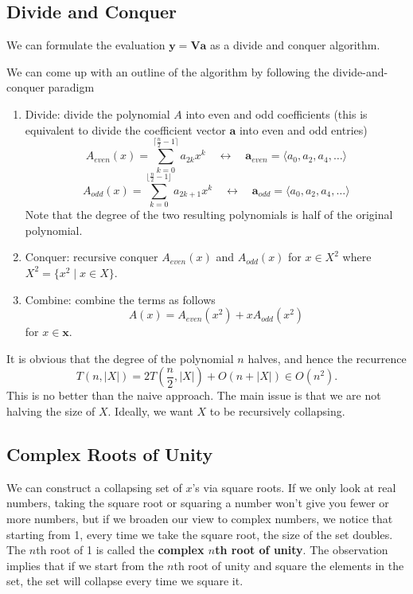\subsection{Divide and Conquer}

We can formulate the evaluation $\mathbf{y}=\mathbf{V}\mathbf{a}$ as a divide and conquer algorithm.

We can come up with an outline of the algorithm by following the divide-and-conquer paradigm
\begin{enumerate}
    \item Divide: divide the polynomial $A$ into even and odd coefficients (this is equivalent to divide the coefficient vector $\mathbf{a}$ into even and odd entries)
    $$
    A_{even}(x) = \sum_{k=0}^{\lceil \frac{n}{2}-1 \rceil} a_{2k}x^k \quad \leftrightarrow \quad \mathbf{a}_{even} = \langle a_0,a_2,a_4,\ldots \rangle
    $$
    $$
    A_{odd}(x) = \sum_{k=0}^{\lfloor \frac{n}{2}-1 \rfloor} a_{2k+1}x^k \quad \leftrightarrow \quad \mathbf{a}_{odd} = \langle a_0,a_2,a_4,\ldots \rangle
    $$
    Note that the degree of the two resulting polynomials is half of the original polynomial.

    \item Conquer: recursive conquer $A_{even}(x)$ and $A_{odd}(x)$ for $x \in X^2$ where $X^2 = \{x^2 \mid x \in X\}$.
    
    \item Combine: combine the terms as follows
    $$
    A(x) = A_{even}(x^2) + xA_{odd}(x^2)
    $$
    for $x \in \mathbf{x}$.
\end{enumerate}

It is obvious that the degree of the polynomial $n$ halves, and hence the recurrence
$$
T(n,|X|) = 2T\left( \frac{n}{2},|X| \right) + O(n + |X|) \in O(n^2).
$$
This is no better than the naive approach. The main issue is that we are not halving the size of $X$. Ideally, we want $X$ to be recursively collapsing.

\subsection{Complex Roots of Unity}

We can construct a collapsing set of $x$'s via square roots. If we only look at real numbers, taking the square root or squaring a number won't give you fewer or more numbers, but if we broaden our view to complex numbers, we notice that starting from 1, every time we take the square root, the size of the set doubles. The $n$th root of 1 is called the \textbf{complex $n$th root of unity}. The observation implies that if we start from the $n$th root of unity and square the elements in the set, the set will collapse every time we square it.

